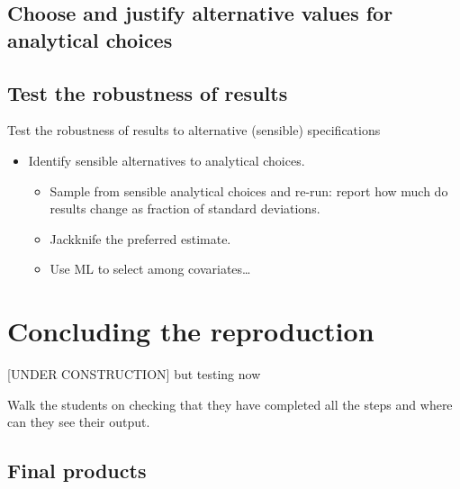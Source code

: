 \documentclass[]{book}
\providecommand{\tightlist}{%
  \setlength{\itemsep}{0pt}\setlength{\parskip}{0pt}}
\begin{document}
\hypertarget{test-rob}{%
\section{Choose and justify alternative values for analytical choices}\label{test-rob}}

\hypertarget{test-the-robustness-of-results}{%
\section{Test the robustness of results}\label{test-the-robustness-of-results}}

Test the robustness of results to alternative (sensible) specifications

\begin{itemize}
\tightlist
\item
  Identify sensible alternatives to analytical choices.

  \begin{itemize}
  \tightlist
  \item
    Sample from sensible analytical choices and re-run: report how much do results change as fraction of standard deviations.\\
  \item
    Jackknife the preferred estimate.
  \item
    Use ML to select among covariates\ldots{}
  \end{itemize}
\end{itemize}

\hypertarget{concluding-the-reproduction}{%
\chapter{Concluding the reproduction}\label{concluding-the-reproduction}}

{[}UNDER CONSTRUCTION{]} but testing now

Walk the students on checking that they have completed all the steps and where can they see their output.

\hypertarget{final-products}{%
\section{Final products}\label{final-products}}
\end{document}
